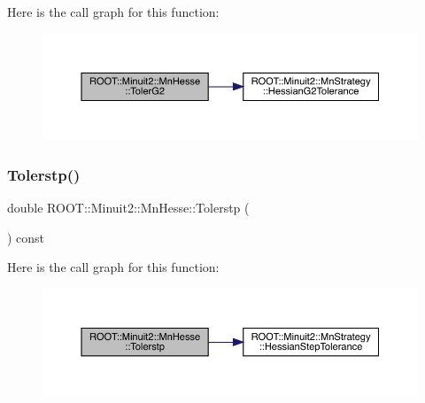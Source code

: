 Here is the call graph for this function\+:
\nopagebreak
\begin{figure}[H]
\begin{center}
\leavevmode
\includegraphics[width=350pt]{d1/d02/classROOT_1_1Minuit2_1_1MnHesse_ae625b94360c1c974854b63aedbcc6a1a_cgraph}
\end{center}
\end{figure}
\mbox{\label{classROOT_1_1Minuit2_1_1MnHesse_a4b36474a0d157ecb634bbf5d120db669}} 
\subsubsection{\texorpdfstring{Tolerstp()}{Tolerstp()}\hspace{0.1cm}{\footnotesize\ttfamily [1/3]}}
{\footnotesize\ttfamily double R\+O\+O\+T\+::\+Minuit2\+::\+Mn\+Hesse\+::\+Tolerstp (\begin{DoxyParamCaption}{ }\end{DoxyParamCaption}) const\hspace{0.3cm}{\ttfamily [inline]}}

Here is the call graph for this function\+:
\nopagebreak
\begin{figure}[H]
\begin{center}
\leavevmode
\includegraphics[width=350pt]{d1/d02/classROOT_1_1Minuit2_1_1MnHesse_a4b36474a0d157ecb634bbf5d120db669_cgraph}
\end{center}
\end{figure}
\mbox{\label{classROOT_1_1Minuit2_1_1MnHesse_a4b36474a0d157ecb634bbf5d120db669}} 
